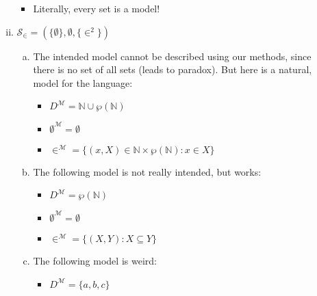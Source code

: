 \begin{enumerate}[\thesection.1]
\begin{enumerate}[(i)]
				\begin{itemize}
				
					\item Literally, every set is a model!
				
				\end{itemize}
				
				\item $\mathcal{S}_\in=(\{\emptyset\}, \emptyset, \{\in^2\})$
				
				\begin{enumerate}[(a)]
				
				
					\item The intended model cannot be described using our methods, since there is no set of all sets (leads to paradox). But here is a natural, model for the language:
					
					\begin{itemize}
					
						\item $D^\mathcal{M}=\mathbb{N}\cup\wp(\mathbb{N})$
						
						\item $\emptyset^\mathcal{M}=\emptyset$
						
						\item $\in^\mathcal{M}=\{(x,X)\in \mathbb{N}\times\wp(\mathbb{N}): x\in X\}$
						
					\end{itemize}
					
					\item The following model is not really intended, but works:
					
					\begin{itemize}
					
						\item $D^\mathcal{M}=\wp(\mathbb{N})$
						
						\item $\emptyset^\mathcal{M}=\emptyset$
						
						\item $\in^\mathcal{M}=\{(X,Y): X\subseteq Y\}$
						
					\end{itemize}
					
					\item The following model is weird:
					
					\begin{itemize}
					
						\item $D^\mathcal{M}=\{a,b,c\}$
						

\end{itemize}
\end{enumerate}
\end{enumerate}
\end{enumerate}
